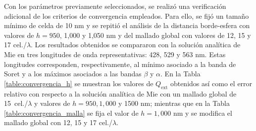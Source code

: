 Con los parámetros previamente seleccionados, se realizó una verificación adicional de los criterios de convergencia empleados. Para ello, se fijó un tamaño mínimo de celda de 10 nm y se repitió el análisis de la distancia borde-esfera con valores de $h=950$, 1,000 y 1,050 nm y del mallado global con valores de 12, 15 y 17 cel./$\lambda$. Los resultados obtenidos se compararon con la solución analítica de Mie en tres longitudes de onda representativas: 428, 529 y 563 nm. Estas longitudes corresponden, respectivamente, al mínimo asociado a la banda de Soret y a los máximos asociados a las bandas $\beta$ y $\alpha$. En la Tabla \ref{table:convergencia_h} se muestran los valores de $Q_{\text{ext}}$ obtenidos así como el error relativo con respecto a la solución analítica de Mie con un mallado global de 15~cel./$\lambda$ y valores de $h=950, 1,000$ y 1500 nm; mientras que en la Tabla \ref{table:convergencia_malla} se fija el valor de $h=1,000$ nm y se modifica el mallado global con 12, 15 y 17 cel./$\lambda$.
%
